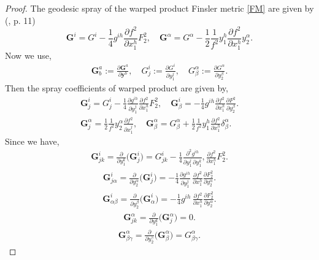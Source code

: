 \documentclass[pdflatex,sn-mathphys-num]{sn-jnl}%
\theoremstyle{thmstyleone}%
\theoremstyle{thmstyletwo}%
\theoremstyle{thmstylethree}%
\begin{document}
	\begin{proof}
		The geodesic spray  of the warped product Finsler metric \eqref{FM} are given by (\cite{wlt}, p. 11) 
  \begin{equation}\label{coeff}
		\mathbf{G}^i=G^i-\frac{1}{4}g^{ih}\frac{\partial f^2}{\partial x_1^h}F_2^2,\quad \mathbf{G}^\alpha=G^\alpha-\frac{1}{2}\frac{1}{f^2}y_1^h\frac{\partial f^2}{\partial x_1^h}y_2^\alpha.
	\end{equation}
		Now we use, \begin{align*}
			\mathbf{G}^a_b :=\frac{\partial \mathbf{G}^a}{\partial \mathbf{y}^b},\quad G^i_j:=\frac{\partial G^i}{\partial y_1^j},\quad G^\alpha_\beta:=\frac{\partial G^\alpha}{\partial y_2^\beta}.  
		\end{align*}
		Then the spray coefficients of warped product are given by,
		\begin{align*}
			\mathbf{G}^i_j=G^i_j-\frac{1}{4}\frac{\partial g^{ih}}{\partial y_1^j}\frac{\partial f^2}{\partial x_1^h}F_2^2,\quad\mathbf{G}^i_\beta= -\frac{1}{4}g^{ih}\frac{\partial f^2}{\partial x_1^h}\frac{\partial F^2}{\partial y_2^\beta}.\\
			\mathbf{G}^\alpha_j=\frac{1}{2}\frac{1}{f^2}y_2^\alpha\frac{\partial f^2}{\partial x_1^j},\quad\mathbf{G}^\alpha_\beta=G^\alpha_\beta+\frac{1}{2}\frac{1}{f^2}y_1^h\frac{\partial f^2}{\partial x_1^h}\delta^\alpha_\beta.
		\end{align*}
		Since we have,
		\begin{align}
			\mathbf{G}^i_{jk}=\frac{\partial}{\partial y_1^k}\Bigg(\mathbf{G}^i_j\Bigg)=G^i_{jk}-\frac{1}{4}\frac{\partial^2 g^{ih}}{\partial y^j_1\, \partial y_1^k}, \frac{\partial f^2}{\partial x_1^h} F_2^2. 
		\end{align}
		\begin{align}
			\mathbf{G}^i_{j\alpha}=\frac{\partial}{\partial y_2^\alpha}\Bigg(\mathbf{G}^i_j\Bigg)=-\frac{1}{4}\frac{\partial g^{ih}}{\partial y_1^j}\,\frac{\partial f^2}{\partial x_1^h} \frac{\partial F_2^2}{\partial y_2^\alpha}.
		\end{align}
		\begin{align}
			\mathbf{G}^i_{\alpha\beta }=\frac{\partial}{\partial y_2^\beta}\Bigg(\mathbf{G}^i_{\alpha }\Bigg)= -\frac{1}{4} g^{ih}\,\frac{\partial f^2}{\partial x_1^h} \frac{\partial F_2^2}{\partial y_2^\alpha}.  
		\end{align}
		\begin{align}
			\mathbf{G}^\alpha_{jk} =\frac{\partial}{\partial y_1^k}\Bigg(\mathbf{G}^\alpha_j\Bigg)=0.   
		\end{align}
		\begin{align}
			\mathbf{G}^\alpha_{\beta\gamma}= \frac{\partial}{\partial y_2^\gamma}\Bigg(\mathbf{G}^\alpha_\beta\Bigg) =G^\alpha_{\beta\gamma}. 
		\end{align}


\end{proof}
\end{document}
